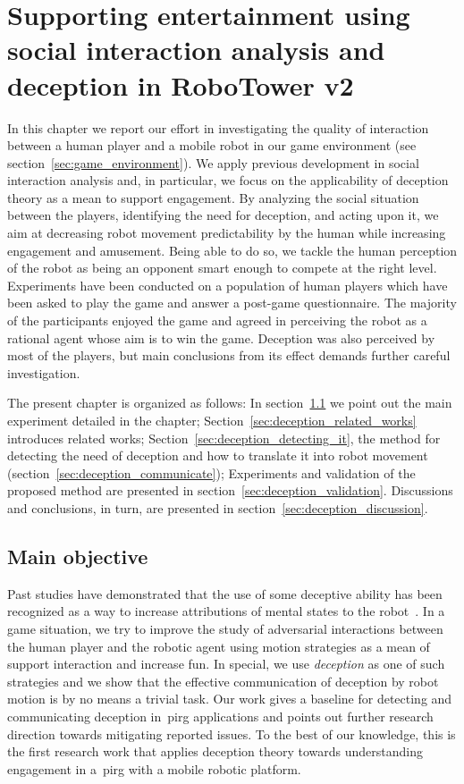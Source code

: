 \chapter{Supporting entertainment using social interaction analysis and deception in RoboTower v2}\label{ch:deception}

In this chapter we report our effort in investigating the quality of interaction between a human player and a mobile robot in our game environment (see section~\ref{sec:game_environment}). We apply previous development in social interaction analysis and, in particular, we focus on the applicability of deception theory as a mean to support engagement. By analyzing the social situation between the players, identifying the need for deception, and acting upon it, we aim at decreasing robot movement predictability by the human while increasing engagement and amusement. Being able to do so, we tackle the human perception of the robot as being an opponent smart enough to compete at the right level. Experiments have been conducted on a population of human players which have been asked to play the game and answer a post-game questionnaire. The majority of the participants enjoyed the game and agreed in perceiving the robot as a rational agent whose aim is to win the game. Deception was also perceived by most of the players, but main conclusions from its effect demands further careful investigation.

The present chapter is organized as follows: In section~\ref{sec:deception_main_objectives} we point out the main experiment detailed in the chapter; Section~\ref{sec:deception_related_works} introduces related works; Section~\ref{sec:deception_detecting_it}, the method for detecting the need of deception and how to translate it into robot movement (section~\ref{sec:deception_communicate}); Experiments and validation of the proposed method are presented in section~\ref{sec:deception_validation}. Discussions and conclusions, in turn, are presented in section~\ref{sec:deception_discussion}.

\section{Main objective}\label{sec:deception_main_objectives}

Past studies have demonstrated that the use of some deceptive ability has been recognized as a way to increase attributions of mental states to the robot~\citep{shim_taxonomy_2013}. In a game situation, we try to improve the study of adversarial interactions between the human player and the robotic agent using motion strategies as a mean of support interaction and increase fun. In special, we use \textit{deception} as one of such strategies and we show that the effective communication of deception by robot motion is by no means a trivial task. Our work gives a baseline for detecting and communicating deception in~\gls{pirg} applications and points out further research direction towards mitigating reported issues. To the best of our knowledge, this is the first research work that applies deception theory towards understanding engagement in a~\gls{pirg} with a mobile robotic platform.

